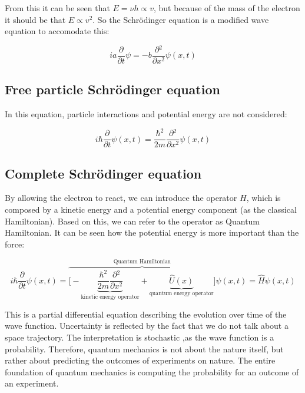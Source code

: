 From this it can be seen that $E=\nu h\propto v$, but because of the mass of the electron it should be that $E\propto v^2$.
So the Schr\"odinger equation is a modified wave equation to accomodate this:

$$ia \frac{\partial {}}{\partial {t}}\psi=-b \frac{\partial {^2}}{\partial {x^2}}\psi(x,t)$$

  \subsection{Free particle Schr\"odinger equation}
  In this equation, particle interactions and potential energy are not considered:

  $$i\hbar \frac{\partial {}}{\partial {t}}\psi(x,t) = \frac{\hbar^2}{2m}\frac{\partial {^2}}{\partial {x^2}}\psi(x,t)$$

  \subsection{Complete Schr\"odinger equation}
  By allowing the electron to react, we can introduce the operator $H$, which is composed by a kinetic energy and a potential energy component (as the classical Hamiltonian).
  Based on this, we can refer to the operator as Quantum Hamiltonian.
  It can be seen how the potential energy is more important than the force:

  $$i\hbar \frac{\partial {}}{\partial {t}}\psi(x,t) = \overbrace{\biggl[-\underbrace{\frac{\hbar^2}{2m}\frac{\partial {^2}}{\partial {x^2}}}_{\text{kinetic energy operator}}+\underbrace{\hat{U}(x)}_{\text{quantum energy operator}}\biggr]}^{\text{Quantum Hamiltonian}}\psi(x,t) = \hat{H}\psi(x,t)$$

  This is a partial differential equation describing the evolution over time of the wave function.
  Uncertainty is reflected by the fact that we do not talk about a space trajectory.
  The interpretation is stochastic ,as the wave function is a probability.
  Therefore, quantum mechanics is not about the nature itself, but rather about predicting the outcomes of experiments on nature.
  The entire foundation of quantum mechanics is computing the probability for an outcome of an experiment.
